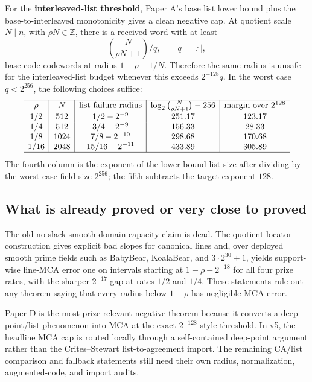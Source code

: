 \documentclass[11pt]{article}
\newcommand{\F}{\mathbb F}
\begin{document}
For the \textbf{interleaved-list threshold}, Paper A's base list lower bound
plus the base-to-interleaved monotonicity gives a clean negative cap.  At quotient
scale \(N\mid n\), with \(\rho N\in\mathbb Z\), there is a received word with at
least
\[
  \binom{N}{\rho N+1}/q,
  \qquad q=|\F|,
\]
base-code codewords at radius \(1-\rho-1/N\).  Therefore the same radius is
unsafe for the interleaved-list budget whenever this exceeds \(2^{-128}q\).  In
the worst case \(q<2^{256}\), the following choices suffice:
\[
\begin{array}{c|c|c|c|c}
\hline
\rho & N & \text{list-failure radius} &
\log_2\binom{N}{\rho N+1}-256 &
\text{margin over }2^{128}\\
\hline
1/2  & 512  & 1/2-2^{-9}    & 251.17 & 123.17\\
1/4  & 512  & 3/4-2^{-9}    & 156.33 & 28.33\\
1/8  & 1024 & 7/8-2^{-10}   & 298.68 & 170.68\\
1/16 & 2048 & 15/16-2^{-11} & 433.89 & 305.89\\
\hline
\end{array}
\]
The fourth column is the exponent of the lower-bound list size after dividing by
the worst-case field size \(2^{256}\); the fifth subtracts the target exponent
\(128\).

\subsection{What is already proved or very close to proved}

The old no-slack smooth-domain capacity claim is dead.  The quotient-locator
construction gives explicit bad slopes for canonical lines and, over deployed
smooth prime fields such as BabyBear, KoalaBear, and \(3\cdot2^{30}+1\), yields
support-wise line-MCA error one on intervals starting at
\(1-\rho-2^{-18}\) for all four prize rates, with the sharper \(2^{-17}\) gap
at rates \(1/2\) and \(1/4\).  These statements rule out any theorem saying
that every radius below \(1-\rho\) has negligible MCA error.

Paper D is the most prize-relevant negative theorem because it converts a deep
point/list phenomenon into MCA at the exact \(2^{-128}\)-style threshold.  In
v5, the headline MCA cap is routed locally through a self-contained deep-point
argument rather than the Crites--Stewart list-to-agreement import.  The remaining
CA/list comparison and fallback statements still need their own radius,
normalization, augmented-code, and import audits.
\end{document}
